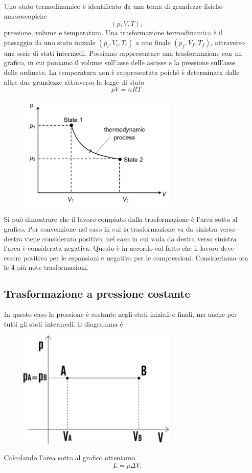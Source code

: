 \documentclass{article}
\theoremstyle{definition}
\begin{document}
Uno stato termodinamico è identificato da una terna di grandezze fisiche macroscopiche $$(p,V,T),$$ pressione, volume e temperatura. Una trasformazione termodinamica è il passaggio da uno stato iniziale $(p_i,V_i,T_i)$ a uno finale $(p_f,V_f,T_f)$, attraverso una serie di stati intermedi. Possiamo rappresentare una trasformazione con un grafico, in cui poniamo il volume sull'asse delle ascisse e la pressione sull'asse delle ordinate. La temperatura non è rappresentata poiché è determinata dalle altre due grandezze attraverso la legge di stato $$pV=nRT.$$  
\begin{figure}[H]
    \centering
    \includegraphics[width=0.7\textwidth]{images/pV.png}
\end{figure} 

Si può dimostrare che il lavoro compiuto dalla trasformazione è l'area sotto al grafico. Per convenzione nel caso in cui la trasformazione va da sinistra verso destra viene considerato positivo, nel caso in cui vada da destra verso sinistra l'area è considerata negativa. Questo è in accordo col fatto che il lavoro deve essere positivo per le espansioni e negativo per le compressioni. Consideriamo ora le 4 più note trasformazioni. 

\subsection{Trasformazione a pressione costante}
In questo caso la pressione è costante negli stati iniziali e finali, ma anche per tutti gli stati intermedi. Il diagramma è 
\begin{figure}[H]
    \centering
    \includegraphics[width=0.7\textwidth]{images/pcost.png}
\end{figure} 
Calcolando l'area sotto al grafico otteniamo $$L=p\Delta V.$$
\end{document}
